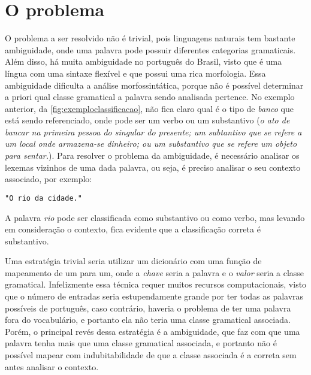 \chapter{O problema}\label{oproblema}

O problema a ser resolvido não é trivial, pois linguagens naturais tem bastante ambiguidade, onde uma palavra pode possuir diferentes categorias gramaticais. Além disso, há muita ambiguidade no português do Brasil, visto que é uma língua com uma sintaxe flexível e que possui uma rica morfologia. Essa ambiguidade dificulta a análise morfossintática, porque não é possível determinar a priori qual classe gramatical a palavra sendo analisada pertence. No exemplo anterior, da \autoref{fig:exemploclassificacao}, não fica claro qual é o tipo de \textit{banco} que está sendo referenciado, onde pode ser um verbo ou um substantivo (\textit{o ato de bancar na primeira pessoa do singular do presente; um subtantivo que se refere a um local onde armazena-se dinheiro; ou um substantivo que se refere um objeto para sentar.}). Para resolver o problema da ambiguidade, é necessário analisar os lexemas vizinhos de uma dada palavra, ou seja, é preciso analisar o seu contexto associado, por exemplo:


\begin{center}
\texttt{"O rio da cidade."}
\end{center}

A palavra \textit{rio} pode ser classificada como substantivo ou como verbo, mas levando em consideração o contexto, fica evidente que a classificação correta é substantivo.

Uma estratégia trivial seria utilizar um dicionário com uma função de mapeamento de um para um, onde a \textit{chave} seria a palavra e o \textit{valor} seria a classe gramatical. Infelizmente essa técnica requer muitos recursos computacionais, visto que o número de entradas seria estupendamente grande por ter todas as palavras possíveis de português, caso contrário, haveria o
problema de ter uma palavra fora do vocabulário, e portanto ela não teria uma classe gramatical associada. Porém, o principal revés dessa estratégia é a ambiguidade, que faz com que uma palavra tenha mais que uma classe gramatical associada, e portanto não é possível mapear com indubitabilidade de que a classe associada é a correta sem antes analisar o contexto.

